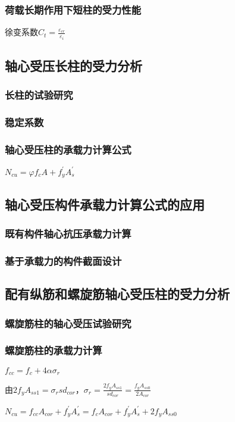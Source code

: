 \documentclass{article}
\begin{document}
\subsubsection{荷载长期作用下短柱的受力性能}
\par 徐变系数$C_t=\frac{\varepsilon_{cr}}{\varepsilon_i}$
\subsection{轴心受压长柱的受力分析}
\subsubsection{长柱的试验研究}
\subsubsection{稳定系数}
\subsubsection{轴心受压柱的承载力计算公式}
\par $N_{cu}=\varphi f_cA+f_y^{\prime}A_s^{\prime}$
\subsection{轴心受压构件承载力计算公式的应用}
\subsubsection{既有构件轴心抗压承载力计算}
\subsubsection{基于承载力的构件截面设计}
\subsection{配有纵筋和螺旋筋轴心受压柱的受力分析}
\subsubsection{螺旋筋柱的轴心受压试验研究}
\subsubsection{螺旋筋柱的承载力计算}
\par $f_{cc}=f_c+4\alpha\sigma_r$
\par 由$2f_yA_{ss1}=\sigma_rsd_{cor}$，$\sigma_r=\frac{2f_yA_{ss1}}{sd_{cor}}=\frac{f_yA_{ss0}}{2A_{cor}}$
\par $N_{cu}=f_{cc}A_{cor}+f_y^{\prime}A_s^{\prime}=f_cA_{cor}+f_y^{\prime}A_s^{\prime}+2f_yA_{ss0}$
\end{document}
